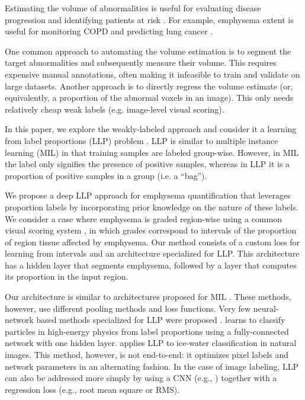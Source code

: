 \documentclass{llncs}
\begin{document}
Estimating the volume of abnormalities is useful for evaluating disease progression and identifying patients at risk \cite{bos2014,cystic2007,Wille2016,Wille2014}.
For example, emphysema extent is useful for monitoring COPD \cite{Wille2014} and predicting lung cancer \cite{Wille2016}.

One common approach to automating the volume estimation is to segment the target abnormalities and subsequently measure their volume.
This requires expensive manual annotations, often making it infeasible to train and validate on large datasets.
Another approach is to directly regress the volume estimate (or, equivalently, a proportion of the abnormal voxels in an image).
This only needs relatively cheap weak labels (e.g. image-level visual scoring).

In this paper, we explore the weakly-labeled approach and consider it a learning from label proportions (LLP) problem \cite{Patrini2014}.
LLP is similar to multiple instance learning (MIL) in that training samples are labeled group-wise.
However, in MIL the label only signifies the presence of positive samples, whereas in LLP it is a proportion of positive samples in a group (i.e. a ``bag'').

We propose a deep LLP approach for emphysema quantification that leverages proportion labels by incorporating prior knowledge on the nature of these labels.
We consider a case where emphysema is graded region-wise using a common visual scoring system \cite{Wille2014}, in which grades correspond to intervals of the proportion of region tissue affected by emphysema.
Our method consists of a custom loss for learning from intervals and an architecture specialized for LLP.
This architecture has a hidden layer that segments emphysema, followed by a layer that computes its proportion in the input region.

Our architecture is similar to architectures proposed for MIL \cite{Wang2018}.
These methods, however, use different pooling methods and loss functions.
Very few neural-network based methods specialized for LLP were proposed \cite{dery2017weakly,li2015alter}.
\cite{dery2017weakly} learns to classify particles in high-energy physics from label proportions using a fully-connected network with one hidden layer.
\cite{li2015alter} applies LLP to ice-water classification in natural images.
This method, however, is not end-to-end: it optimizes pixel labels and network parameters in an alternating fashion.
In the case of image labeling, LLP can also be addressed more simply by using a CNN (e.g., \cite{Dubost2017,He2016}) together with a regression loss (e.g., root mean square or RMS).
\end{document}
